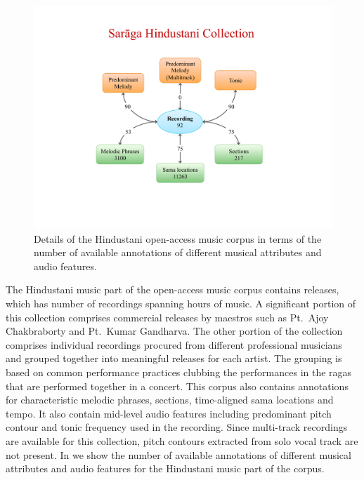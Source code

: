 \begin{figure}
	\begin{center}
		\includegraphics[width=\figSizeNinety]{ch04_datasets/figures/hindustani_CC_details.pdf}
	\end{center}
	\caption[Details of the Hindustani open-access music corpus]{Details of the Hindustani open-access music corpus in terms of the number of available annotations of different musical attributes and audio features.}
	\label{fig:hindustani_open_access_corpus_details}
\end{figure}

The Hindustani music part of the open-access music corpus contains  releases, which has  number of recordings spanning  hours of music. A significant portion of this collection comprises commercial releases by maestros such as Pt.~Ajoy Chakbraborty and Pt.~Kumar Gandharva. The other portion of the collection comprises individual recordings procured from different professional musicians and grouped together into meaningful releases for each artist. The grouping is based on common performance practices clubbing the performances in the \glspl{raga} that are performed together in a concert. This corpus also contains annotations for characteristic melodic phrases, sections, time-aligned sama locations and tempo. It also contain mid-level audio features including predominant pitch contour and tonic frequency used in the recording. Since multi-track recordings are available for this collection, pitch contours extracted from solo vocal track are not present. In  we show the number of available annotations of different musical attributes and audio features for the Hindustani music part of the corpus. 



